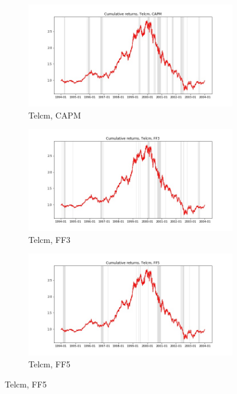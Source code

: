 \documentclass{article}
\begin{document}
  \begin{figure}
  \centering
  \begin{subfigure}[b]{0.3\textwidth}
    \centering
    \includegraphics[width=\textwidth]{Telcm/bwunif_full_cumrets_ofint_CAPM.jpg}
    \caption{Telcm, CAPM}
    \label{fig:1}
  \end{subfigure}
  \begin{subfigure}[b]{0.3\textwidth}
    \centering
    \includegraphics[width=\textwidth]{Telcm/bwunif_full_cumrets_ofint_FF3.jpg}
    \caption{Telcm, FF3}
    \label{fig:2}
  \end{subfigure}
    \begin{subfigure}[b]{0.3\textwidth}
    \centering
    \includegraphics[width=\textwidth]{Telcm/bwunif_full_cumrets_ofint_FF5.jpg}
    \caption{Telcm, FF5}
    \label{fig:1}
  \end{subfigure}
  \end{figure}
  
\end{document}
